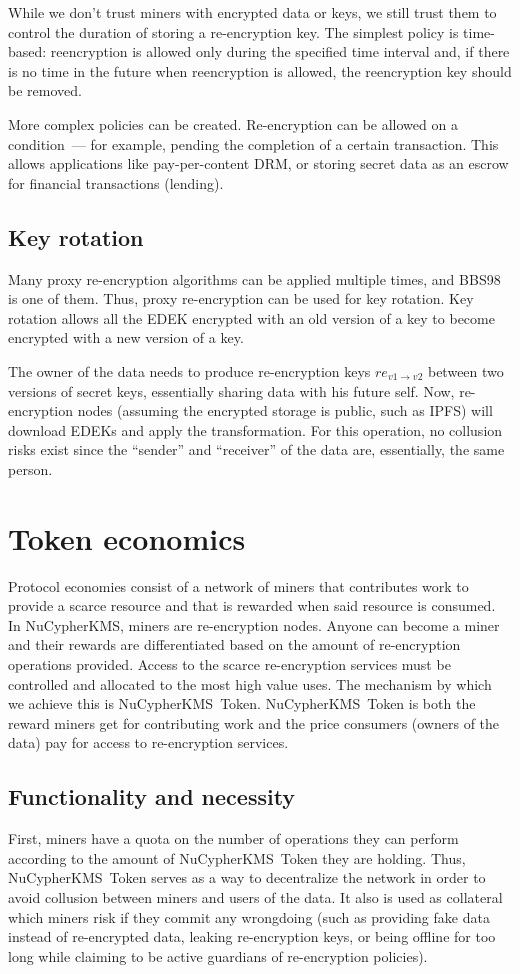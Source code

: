 \documentclass[notitlepage,longbibliography]{revtex4-1}
\newcommand{\kms}{NuCypherKMS}
\begin{document}
While we don't trust miners with encrypted data or keys, we still trust them to control the duration of storing a re-encryption key.
The simplest policy is time-based: reencryption is allowed only during the specified time interval and, if there is no time in the future when
reencryption is allowed, the reencryption key should be removed.

More complex policies can be created.
Re-encryption can be allowed on a condition~--- for example, pending the completion of a certain transaction.
This allows applications like pay-per-content DRM, or storing secret data as an escrow for financial transactions (lending).

\subsection{Key rotation}

Many proxy re-encryption algorithms can be applied multiple times, and BBS98~\cite{BBS98} is one of them.
Thus, proxy re-encryption can be used for key rotation.
Key rotation allows all the EDEK encrypted with an old version of a key to become encrypted with a new version of a key.

The owner of the data needs to produce re-encryption keys $re_{v1\rightarrow v2}$ between two versions of secret keys, essentially
sharing data with his future self.
Now, re-encryption nodes (assuming the encrypted storage is public, such as IPFS) will download EDEKs and apply the transformation.
For this operation, no collusion risks exist since the ``sender'' and ``receiver'' of the data are, essentially, the same person.

\section{Token economics}
Protocol economies consist of a network of miners that contributes work to provide a scarce resource and that is
rewarded when said resource is consumed.
In \kms, miners are re-encryption nodes.
Anyone can become a miner and their rewards are differentiated based on the amount of re-encryption operations provided.
Access to the scarce re-encryption services must be controlled and allocated to the most high value uses.
The mechanism by which we achieve this is \kms~Token. \kms~Token is both the reward miners get for contributing
work and the price consumers (owners of the data) pay for access to re-encryption services.

\subsection{Functionality and necessity}
First, miners have a quota on the number of operations they can perform according to the amount of \kms~Token they are holding.
Thus, \kms~Token serves as a way to decentralize the network in order to avoid collusion between miners and users of the data.
It also is used as collateral which miners risk if they commit any wrongdoing (such as providing fake data instead of re-encrypted data, leaking
re-encryption keys, or being offline for too long while claiming to be active guardians of re-encryption policies).
\end{document}
